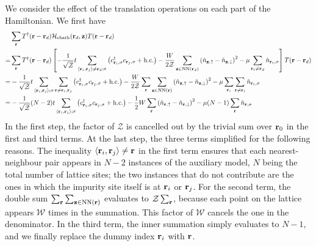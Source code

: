 \documentclass[reprint,hidelinks,onecolumn]{revtex4-2}
\begin{document}
We consider the effect of the translation operations on each part of the Hamiltonian. We first have
\begin{equation}\begin{aligned}
	&\sum_{{\bf r}}T^\dagger({\bf r} - {\bf r}_d)\mathcal{H}_\text{cbath}({\bf r}_d, {\bf z})T({\bf r} - {\bf r}_d) \\
	=& \sum_{{\bf r}}T^\dagger({\bf r} - {\bf r}_d)\left[-\frac{1}{\sqrt\mathcal{Z}}t\sum_{\left<{\bf r}_i, {\bf r}_j\right>\neq{\bf r}_d;\sigma}\left(c^\dagger_{{\bf r}_i,\sigma}c_{{\bf r}_j,\sigma} + \text{h.c.}\right) - \frac{W}{2\mathcal{Z}}\sum_{{\bf z}\in\text{NN}({\bf r}_d)}\left(\hat n_{{\bf z}, \uparrow} - \hat n_{{\bf z}, \downarrow}\right)^2 - \mu \sum_{{\bf r}_i \neq {\bf r}_d}\hat n_{{\bf r}_i,\sigma}\right]T({\bf r} - {\bf r}_d) \\
	=& -\frac{1}{\sqrt\mathcal{Z}}t\sum_{\left<{\bf r}_i, {\bf r}_j\right>;\sigma}\sum_{{\bf r}\neq{\bf r}_i,{\bf r}_j}\left(c^\dagger_{{\bf r}_i,\sigma}c_{{\bf r}_j,\sigma} + \text{h.c.}\right) - \frac{W}{2\mathcal{Z}}\sum_{\bf r}\sum_{{\bf z}\in\text{NN}\left({\bf r}\right)}\left(\hat n_{{\bf z}, \uparrow} - \hat n_{{\bf z}, \downarrow}\right)^2 - \mu \sum_{{\bf r}_i}\sum_{{\bf r} \neq {\bf r}_i}\hat n_{{\bf r}_i,\sigma}\\
	=& -\frac{1}{\sqrt\mathcal{Z}}(N-2)t\sum_{\left<{\bf r}_i, {\bf r}_j\right>;\sigma}\left(c^\dagger_{{\bf r}_i,\sigma}c_{{\bf r}_j,\sigma} + \text{h.c.}\right) - \frac{1}{2}W\sum_{\bf r}\left(\hat n_{{\bf r} , \uparrow} - \hat n_{{\bf r} , \downarrow}\right)^2 - \mu (N-1) \sum_{{\bf r}}\hat n_{{\bf r},\sigma}\\
\end{aligned}\end{equation}
In the first step, the factor of \(\mathcal{Z}\) is cancelled out by the trivial sum over \({\bf r}_0\) in the first and third terms. At the last step, the three terms simplified for the following reasons. The inequality \(\left<{\bf r}_i, {\bf r}_j\right>\neq{\bf r}\) in the first term ensures that each nearest-neighbour pair appears in \(N-2\) instances of the auxiliary model, \(N\) being the total number of lattice sites; the two instances that do not contribute are the ones in which the impurity site itself is at \({\bf r}_i\) or \({\bf r}_j\). For the second term, the double sum \(\sum_{\bf r}\sum_{{\bf z} \in \text{NN}({\bf r})}\) evaluates to \(\mathcal{Z}\sum_{\bf r}\), because each point on the lattice appears \(\mathcal{W}\) times in the summation. This factor of \(\mathcal{W}\) cancels the one in the denominator. In the third term, the inner summation simply evaluates to \(N-1\), and we finally replace the dummy index \({\bf r}_i\) with \({\bf r}\). 
\end{document}
